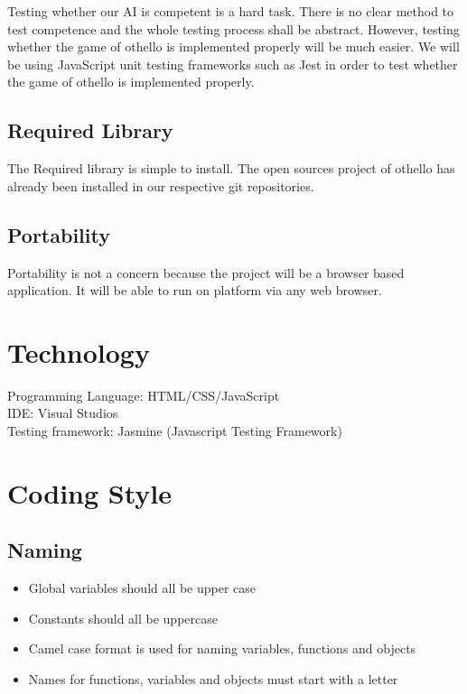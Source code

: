 \documentclass{article}
\begin{document}
Testing whether our AI is competent is a hard task. There is no clear method to test competence and the whole testing process shall be abstract. However, testing whether the game of othello is implemented properly will be much easier. We will be using JavaScript unit testing frameworks such as {\color{blue}Jest} in order to test whether the game of othello is implemented properly.

\subsection*{Required Library}

The Required library is simple to install. The open sources project of othello has already been installed in our respective git repositories.

\subsection*{Portability}

Portability is not a concern because the  project will be a browser based application. It will be able to run on platform via any web browser.


\section*{Technology}

Programming Language: HTML/CSS/JavaScript\\
IDE: Visual Studios\\
Testing framework: Jasmine (Javascript Testing Framework)

\section*{Coding Style}

\subsection*{Naming}
\begin{itemize}
\item Global variables should all be upper case
\item Constants should all be uppercase
\item Camel case format is used for naming variables, functions and objects
\item Names for functions, variables and objects must start with a letter
\end{itemize}
\end{document}
